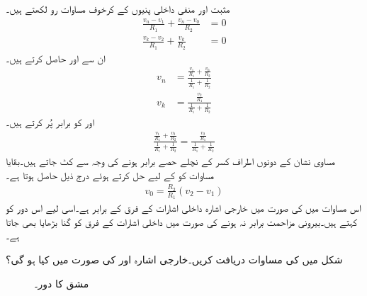 مثبت اور منفی داخلی پنیوں کے کرخوف مساوات رو لکھتے ہیں۔
\begin{align*}
\frac{v_n-v_1}{R_1}+\frac{v_n-v_0}{R_2}&=0\\
\frac{v_k-v_2}{R_1}+\frac{v_k}{R_2}&=0
\end{align*}
ان سے  اور  حاصل کرتے ہیں۔
\begin{align*}
v_n&=\frac{\frac{v_1}{R_1}+\frac{v_0}{R_2}}{\frac{1}{R_1}+\frac{1}{R_2}}\\
v_k&=\frac{\frac{v_2}{R_1}}{\frac{1}{R_1}+\frac{1}{R_2}}
\end{align*}
 اور  کو برابر پُر کرتے ہیں۔
\begin{align*}
\frac{\frac{v_1}{R_1}+\frac{v_0}{R_2}}{\frac{1}{R_1}+\frac{1}{R_2}}=\frac{\frac{v_2}{R_1}}{\frac{1}{R_1}+\frac{1}{R_2}}
\end{align*}
مساوی نشان کے دونوں اطراف کسر کے نچلے حصے برابر ہونے کی وجہ سے کٹ جاتے ہیں۔بقایا مساوات کو  کے لیے حل کرتے ہوئے درج ذیل حاصل ہوتا ہے۔ 
\begin{align}
v_0=\frac{R_2}{R_1} \left(v_2-v_1\right)
\end{align} 
اس مساوات میں  کی صورت میں خارجی اشارہ داخلی اشارات کے فرق کے برابر ہے۔اسی لیے اس دور کو  کہتے ہیں۔بیرونی مزاحمت برابر نہ ہونے کی صورت میں داخلی اشارات کے فرق کو  گنا بڑھایا بھی جاتا ہے۔

شکل  میں  کی مساوات دریافت کریں۔خارجی اشارہ  اور
  کی صورت میں کیا ہو گی؟

\begin{figure}
\centering
{}
\caption{مشق  کا دور۔}
\label{شکل_حسابی_مثال_منفی_کار}
\end{figure}

